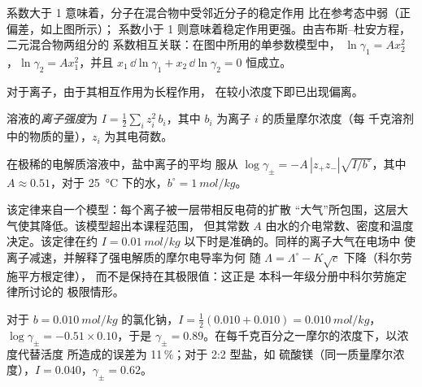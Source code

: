 系数大于 1 意味着，分子在混合物中受邻近分子的稳定作用
比在参考态中弱（正偏差，如上图所示）；
系数小于 1 则意味着稳定作用更强。由吉布斯–杜安方程，二元混合物两组分的
系数相互关联：在图中所用的单参数模型中，
$\ln\gamma_1 = Ax_2^2$，$\ln\gamma_2 = Ax_1^2$，并且
$x_1\,\dd\ln\gamma_1 + x_2\,\dd\ln\gamma_2 = 0$ 恒成立。

对于离子，由于其相互作用为长程作用，
在较小浓度下即已出现偏离。

\begin{definition}[离子强度]\label{def:b2:chemical-potential:ionic-strength}
溶液的\emph{离子强度}为 $I =
\frac12\sum_i z_i^2\,b_i$，其中 $b_i$ 为离子 $i$ 的质量摩尔浓度（每
千克溶剂中的物质的量），$z_i$ 为其电荷数。
\end{definition}

\begin{proposition}[德拜–休克尔极限定律]\label{prop:b2:chemical-potential:debye-huckel}
在极稀的电解质溶液中，盐中离子的平均
服从 $\log\gamma_\pm = -A\,|z_+z_-|\sqrt{I/b^\circ}$，其中 $A
\approx 0.51$，对于 \qty{25}{\celsius} 下的水，$b^\circ =
\qty{1}{mol/kg}$。
\end{proposition}
\admitted

\begin{remark}[适用范围与来源]\label{rem:b2:chemical-potential:dh-range}
该定律来自一个模型：每个离子被一层带相反电荷的扩散
“大气”所包围，这层大气使其降低。该模型超出本课程范围，
但其常数 $A$ 由水的介电常数、密度和温度决定。该定律在约
$I = \qty{0.01}{mol/kg}$ 以下时是准确的。同样的离子大气在电场中
使离子减速，并解释了强电解质的摩尔电导率为何
随 $\Lambda = \Lambda^\circ - K\sqrt c$ 下降（科尔劳施平方根定律），
而不是保持在其极限值：这正是
本科一年级分册中科尔劳施定律所讨论的
极限情形。
\end{remark}

\begin{example}[百分之一摩尔浓度的盐]\label{ex:b2:chemical-potential:dh}
对于 $b = \qty{0.010}{mol/kg}$ 的氯化钠，$I = \frac12(0.010 + 0.010)
= \qty{0.010}{mol/kg}$，$\log\gamma_\pm = -0.51 \times 0.10$，于是 $\gamma_\pm
= 0.89$。在每千克百分之一摩尔的浓度下，以浓度代替活度
所造成的误差为 11\,\%；对于 2:2 型盐，如
硫酸镁（同一质量摩尔浓度），$I = 0.040$，$\gamma_\pm = 0.62$。
\end{example}

